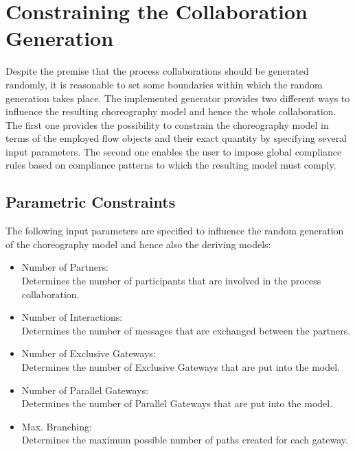 \section{Constraining the Collaboration Generation} \label{sec:constraints}

Despite the premise that the process collaborations should be generated randomly, it is reasonable to set some boundaries within which the random generation takes place. The implemented generator provides two different ways to influence the resulting choreography model and hence the whole collaboration. The first one provides the possibility to constrain the choreography model in terms of the employed flow objects and their exact quantity by specifying several input parameters. The second one enables the user to impose global compliance rules based on compliance patterns to which the resulting model must comply.

\subsection{Parametric Constraints} \label{sec:param_constraints}

The following input parameters are specified to influence the random generation of the choreography model and hence also the deriving models:

\begin{itemize}
\item Number of Partners: \\Determines the number of participants that are involved in the process collaboration.
\item Number of Interactions: \\Determines the number of messages that are exchanged between the partners.
\item Number of Exclusive Gateways: \\Determines the number of Exclusive Gateways that are put into the model.
\item Number of Parallel Gateways: \\Determines the number of Parallel Gateways that are put into the model.
\item Max. Branching: \\Determines the maximum possible number of paths created for each gateway.
\end{itemize}


